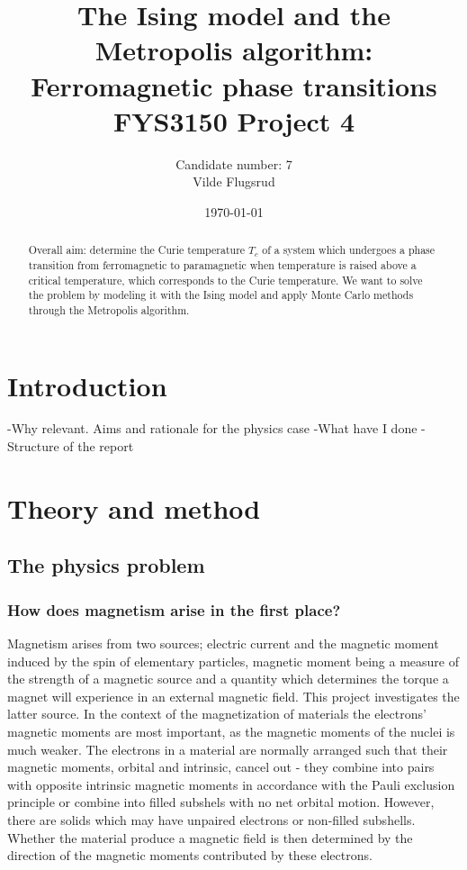 \documentclass[norsk, 10pt, twocolumn, a4paper]{revtex4}
\begin{document}
\title{The Ising model and the Metropolis algorithm: \\ Ferromagnetic phase transitions \\ FYS3150 Project 4}
\author{Candidate number: 7 \\ Vilde Flugsrud}
\date{\today}

\begin{abstract}
    Overall aim: determine the Curie temperature $T_c$ of a system which undergoes a phase transition from ferromagnetic
    to paramagnetic when temperature is raised above a critical temperature, which corresponds to the Curie temperature. We want
    to solve the problem by modeling it with the Ising model and apply Monte Carlo methods through the Metropolis algorithm.

\end{abstract}

\maketitle

\section{Introduction}
-Why relevant. Aims and rationale for the physics case
-What have I done
-Structure of the report

\section{Theory and method}
\subsection{The physics problem}
\subsubsection{How does magnetism arise in the first place?}
Magnetism arises from two sources; electric current and the magnetic moment
induced by the spin of elementary particles, magnetic moment being a measure of the strength of a magnetic source and a
quantity which determines the torque a magnet will experience in an external magnetic field.
This project investigates the latter source. In the context of the magnetization of materials the electrons'
magnetic moments are most important, as the
magnetic moments of the nuclei is much weaker.
The electrons in a material are normally arranged such that their magnetic
moments, orbital and intrinsic, cancel out - they combine into pairs with
opposite intrinsic magnetic moments in accordance with the Pauli exclusion
principle or combine into filled subshels with no net orbital motion.
However, there are solids which may have unpaired electrons or non-filled
subshells. Whether the material produce a magnetic field is then determined
by the direction of the magnetic moments contributed by these electrons.
\end{document}
